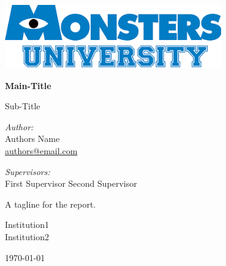 \documentclass[10pt,parskip=half,
	toc=sectionentrywithdots,
	bibliography=totocnumbered,
	captions=tableheading,numbers=noendperiod]{scrartcl}
\begin{document}
		\begin{titlepage}
	\begin{flushright}
		\includegraphics[width=0.7\textwidth]{Example_files/logo_example.png}
	\end{flushright}

	\begin{center}

	\vspace*{1cm}

	\Huge\textbf{Main-Title}

	\vspace{0.5cm}\LARGE{Sub-Title}

	\vspace{1.5cm}

	\begin{minipage}{0.8\textwidth}   
		\begin{center}  
		\begin{minipage}{0.39\textwidth}
		\begin{flushleft} \Large
		\emph{Author:}\\Authors Name\\\href{mailto:authors@email.com}{authors@email.com}
		\end{flushleft}
		\end{minipage}
		\hspace{\fill}
		\begin{minipage}{0.39\textwidth}
		\begin{flushright} \Large\emph{Supervisors:} \\
			  First Supervisor
			  Second Supervisor
		\end{flushright}
		\end{minipage}
		\end{center}   
	\end{minipage}

	\vfill

	\begin{minipage}{0.8\textwidth}
	\begin{center}\LARGE{A tagline for the report.}
	\end{center} 
	\end{minipage}

	\vspace{0.8cm}
		  \LARGE{Institution1}\\
		  \LARGE{Institution2}\\

	\vspace{0.4cm}

	\today

	\end{center}
	\end{titlepage}
\end{document}
